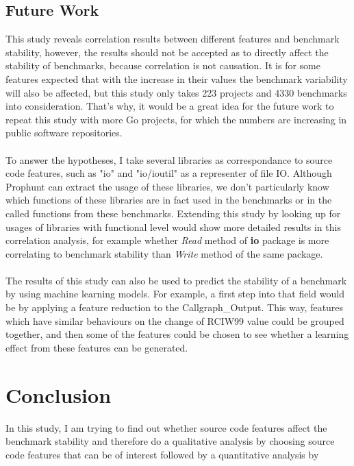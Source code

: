 \documentclass{seal_thesis}
\begin{document}
\section{Future Work}

This study reveals correlation results between different features and benchmark stability, however, the results should not be accepted as to directly affect the stability of benchmarks, because correlation is not causation. It is for some features expected that with the increase in their values the benchmark variability will also be affected, but this study only takes 223 projects and 4330 benchmarks into consideration. That's why, it would be a great idea for the future work to repeat this study with more Go projects, for which the numbers are increasing in public software repositories.\\
\\
To answer the hypotheses, I take several libraries as correspondance to source code features, such as "io" and "io/ioutil" as a representer of file IO. Although Prophunt can extract the usage of these libraries, we don't particularly know which functions of these libraries are in fact used in the benchmarks or in the called functions from these benchmarks. Extending this study by looking up for usages of libraries with functional level would show more detailed results in this correlation analysis, for example whether \textit{Read} method of \textbf{io} package is more correlating to benchmark stability than \textit{Write} method of the same package.\\
\\
The results of this study can also be used to predict the stability of a benchmark by using machine learning models. For example, a first step into that field would be by applying a feature reduction to the Callgraph\_Output. This way, features which have similar behaviours on the change of RCIW99 value could be grouped together, and then some of the features could be chosen to see whether a learning effect from these features can be generated.


\chapter{Conclusion}
\label{Conclusion}

In this study, I am trying to find out whether source code features affect the benchmark stability and therefore do a qualitative analysis by choosing source code features that can be of interest followed by a quantitative analysis by 
\end{document}
